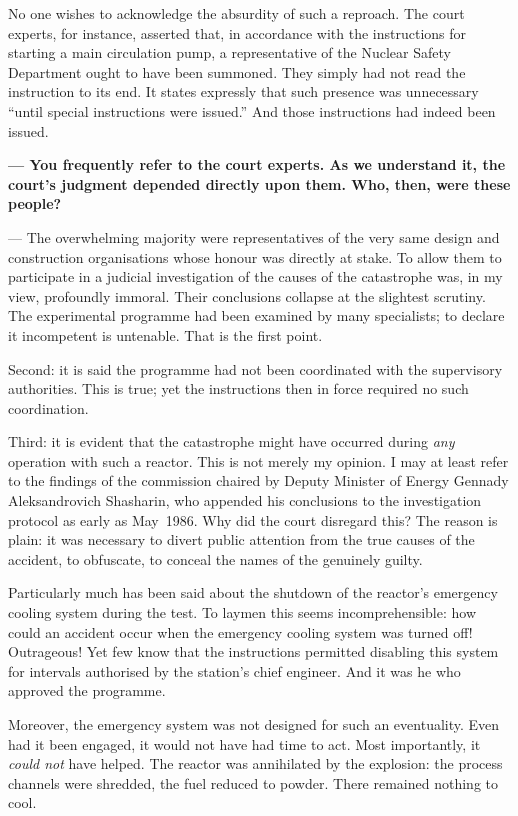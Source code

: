 \documentclass[openright]{bookest}
\begin{document}
No one wishes to acknowledge the absurdity of such a reproach. The court experts, for instance, asserted that, in accordance with the instructions for starting a main circulation pump, a representative of the Nuclear Safety Department ought to have been summoned. They simply had not read the instruction to its end. It states expressly that such presence was unnecessary ``until special instructions were issued.'' And those instructions had indeed been issued.

\medskip

\textbf{--- You frequently refer to the court experts. As we understand it, the court's judgment depended directly upon them. Who, then, were these people?}

\noindent
--- The overwhelming majority were representatives of the very same design and construction organisations whose honour was directly at stake. To allow them to participate in a judicial investigation of the causes of the catastrophe was, in my view, profoundly immoral. Their conclusions collapse at the slightest scrutiny. The experimental programme had been examined by many specialists; to declare it incompetent is untenable. That is the first point.

Second: it is said the programme had not been coordinated with the supervisory authorities. This is true; yet the instructions then in force required no such coordination.

Third: it is evident that the catastrophe might have occurred during \textit{any} operation with such a reactor. This is not merely my opinion. I may at least refer to the findings of the commission chaired by Deputy Minister of Energy Gennady Aleksandrovich Shasharin, who appended his conclusions to the investigation protocol as early as May~1986. Why did the court disregard this? The reason is plain: it was necessary to divert public attention from the true causes of the accident, to obfuscate, to conceal the names of the genuinely guilty.

Particularly much has been said about the shutdown of the reactor's emergency cooling system during the test. To laymen this seems incomprehensible: how could an accident occur when the emergency cooling system was turned off! Outrageous! Yet few know that the instructions permitted disabling this system for intervals authorised by the station's chief engineer. And it was he who approved the programme.

Moreover, the emergency system was not designed for such an eventuality. Even had it been engaged, it would not have had time to act. Most importantly, it \textit{could not} have helped. The reactor was annihilated by the explosion: the process channels were shredded, the fuel reduced to powder. There remained nothing to cool.
\end{document}
